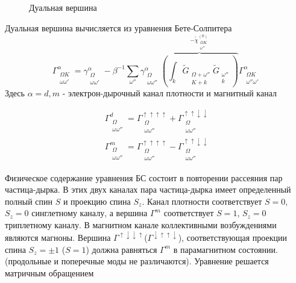\documentclass[11pt,a4paper]{report}
\begin{document}
\begin{figure}[H]
\centering
\diagvertex
\caption{Дуальная вершина}
\end{figure}

Дуальная вершина вычисляется из уравнения Бете-Солпитера
\begin{equation}
\Gamma_{\substack{\Omega K\\ \omega\omega'}}^\alpha = \gamma^\alpha_{\substack{\Omega\\ \omega\omega'}} 
  - \beta^{-1} \sum_{\omega''}\gamma_{\substack{\Omega\\ \omega\omega''}}^\alpha
    \overbrace{\left(\int_k \tilde{G}_{\substack{\Omega+\omega''\\K+k}}\tilde{G}_{\substack{\omega''\\k}}\right)}^{-\tilde{\chi}^{(0)}_{\substack{\Omega K\\\omega''}}}
    \Gamma_{\substack{\Omega K\\\omega''\omega'}}^\alpha
\end{equation}
Здесь $\alpha=d,m$ -  электрон-дырочный канал плотности и магнитный канал

\begin{equation}
\begin{split}
  \Gamma_{\substack{\Omega\\ \omega\omega''}}^d =  \Gamma_{\substack{\Omega\\ \omega\omega''}}^{\uparrow\uparrow\uparrow\uparrow} + \Gamma_{\substack{\Omega\\ \omega\omega''}}^{\uparrow\uparrow\downarrow\downarrow} \\
  \Gamma_{\substack{\Omega\\ \omega\omega''}}^m =  \Gamma_{\substack{\Omega\\ \omega\omega''}}^{\uparrow\uparrow\uparrow\uparrow} - \Gamma_{\substack{\Omega\\ \omega\omega''}}^{\uparrow\uparrow\downarrow\downarrow}
\end{split}
\end{equation}

Физическое содержание уравнения БС состоит в повторении рассеяния пар частица-дырка. В этих двух каналах пара частица-дырка имеет определенный полный спин $S$ и проекцию спина $S_z$.
Канал плотности соответствует $S=0$, $S_z=0$ синглетному каналу, а вершина $\Gamma^m$ соответствует $S=1$, $S_z=0$ триплетному каналу. В магнитном канале коллективными возбуждениями являются магноны.
Вершина $\Gamma^{\uparrow\downarrow\downarrow\uparrow}$($\Gamma^{\downarrow\uparrow\uparrow\downarrow}$), соответствующая проекции спина $S_z=\pm1$ ($S=1$) должна равняться $\Gamma^m$ в парамагнитном состоянии.
(продольные и поперечные моды не различаются). Уравнение решается матричным обращением
\end{document}
